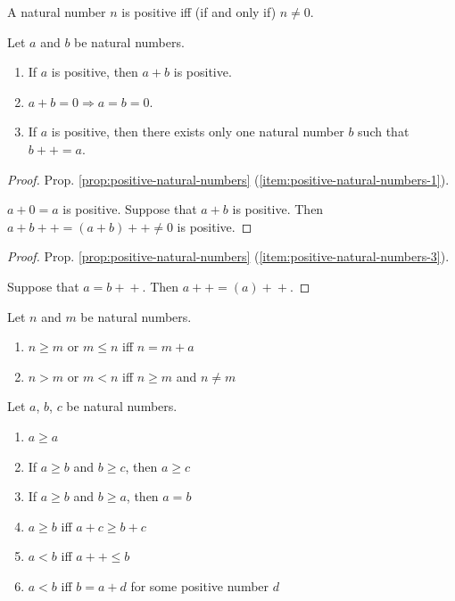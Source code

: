 \documentclass{article}
\newcommand{\pp}{\!+\!+}
\begin{document}
\begin{definition}
    A natural number $n$ is positive iff (if and only if) $n \neq 0$.
\end{definition}

\begin{proposition}
    \label{prop:positive-natural-numbers}
    Let $a$ and $b$ be natural numbers.
    \begin{enumerate}
        \item \label{item:positive-natural-numbers-1} If $a$ is positive, then $a+b$ is positive.
        \item \label{item:positive-natural-numbers-2} $a+b=0 \Rightarrow a=b=0$.
        \item \label{item:positive-natural-numbers-3} If $a$ is positive, then there exists only one natural number $b$ such that $b\pp=a$.
    \end{enumerate}
\end{proposition}

\begin{proof}
    Prop. \ref{prop:positive-natural-numbers} (\ref{item:positive-natural-numbers-1}).

    $a+0=a$ is positive.
    Suppose that $a+b$ is positive.
    Then $a+b\pp=(a+b)\pp \neq 0$ is positive.
\end{proof}

\begin{proof}
    Prop. \ref{prop:positive-natural-numbers} (\ref{item:positive-natural-numbers-3}).

    Suppose that $a=b\pp$.
    Then $a\pp=(a)\pp$.
\end{proof}

\begin{definition}
    Let $n$ and $m$ be natural numbers.
    \begin{enumerate}
        \item $n \geq m$ or $m \leq n$ iff $n=m+a$
        \item $n>m$ or $m<n$ iff $n \geq m$ and $n \neq m$
    \end{enumerate}
\end{definition}

\begin{proposition}
    \label{prop:natural-numbers-order}
    Let $a$, $b$, $c$ be natural numbers.
    \begin{enumerate}
        \item \label{item:natural-numbers-order-1} $a \geq a$
        \item \label{item:natural-numbers-order-2} If $a \geq b$ and $b \geq c$, then $a \geq c$
        \item \label{item:natural-numbers-order-3} If $a \geq b$ and $b \geq a$, then $a=b$
        \item \label{item:natural-numbers-order-4} $a \geq b$ iff $a+c \geq b+c$
        \item \label{item:natural-numbers-order-5} $a<b$ iff $a\pp \leq b$
        \item \label{item:natural-numbers-order-6} $a<b$ iff $b=a+d$ for some positive number $d$
    \end{enumerate}
\end{proposition}
\end{document}
